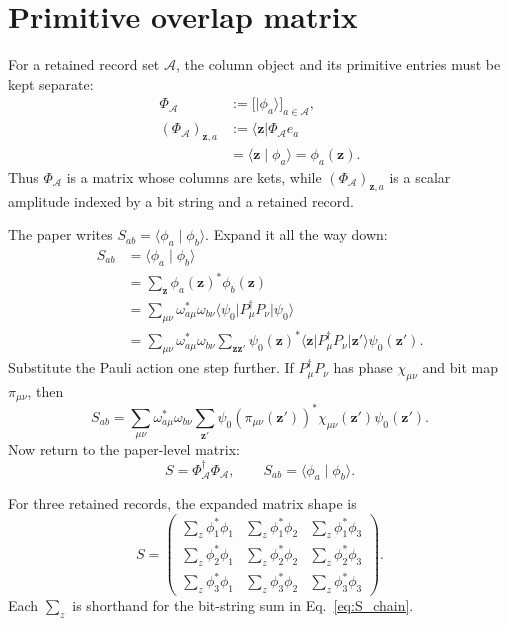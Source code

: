 \documentclass[10pt,twocolumn]{article}
\newcommand{\Acal}{\mathcal A}
\newcommand{\ket}[1]{\lvert #1\rangle}
\newcommand{\bra}[1]{\langle #1\rvert}
\newcommand{\braket}[2]{\langle #1\mid #2\rangle}
\begin{document}
\section{Primitive overlap matrix}

For a retained record set \(\Acal\), the column object and its primitive entries must be kept separate:
\begin{equation}
\begin{aligned}
\Phi_\Acal
&:=\big[\ket{\phi_a}\big]_{a\in\Acal},\\
(\Phi_\Acal)_{\mathbf z,a}
&:=\bra{\mathbf z}\Phi_\Acal e_a\\
&=\braket{\mathbf z}{\phi_a}
=\phi_a(\mathbf z).
\end{aligned}
\label{eq:Phi_entries}
\end{equation}
Thus \(\Phi_\Acal\) is a matrix whose columns are kets, while \((\Phi_\Acal)_{\mathbf z,a}\) is a scalar amplitude indexed by a bit string and a retained record.

The paper writes \(S_{ab}=\braket{\phi_a}{\phi_b}\). Expand it all the way down:
\begin{equation}
\begin{aligned}
S_{ab}
&=\braket{\phi_a}{\phi_b}\\
&=\sum_{\mathbf z}\phi_a(\mathbf z)^*\phi_b(\mathbf z)\\
&=\sum_{\mu\nu}\omega_{a\mu}^*\omega_{b\nu}
\bra{\psi_0}P_\mu^\dagger P_\nu\ket{\psi_0}\\
&=\sum_{\mu\nu}\omega_{a\mu}^*\omega_{b\nu}
\sum_{\mathbf z\mathbf z'}
\psi_0(\mathbf z)^*
\bra{\mathbf z}P_\mu^\dagger P_\nu\ket{\mathbf z'}
\psi_0(\mathbf z').
\end{aligned}
\label{eq:S_chain}
\end{equation}
Substitute the Pauli action one step further. If \(P_\mu^\dagger P_\nu\) has phase \(\chi_{\mu\nu}\) and bit map \(\pi_{\mu\nu}\), then
\begin{equation}
S_{ab}=
\sum_{\mu\nu}\omega_{a\mu}^*\omega_{b\nu}
\sum_{\mathbf z'}
\psi_0(\pi_{\mu\nu}(\mathbf z'))^*
\chi_{\mu\nu}(\mathbf z')
\psi_0(\mathbf z').
\label{eq:S_bit_final}
\end{equation}
Now return to the paper-level matrix:
\begin{equation}
S=\Phi_\Acal^\dagger\Phi_\Acal,
\qquad
S_{ab}=\braket{\phi_a}{\phi_b}.
\label{eq:S_high_return}
\end{equation}

For three retained records, the expanded matrix shape is
\begin{equation}
S=
\begin{pmatrix}
\sum_z\phi_1^*\phi_1&\sum_z\phi_1^*\phi_2&\sum_z\phi_1^*\phi_3\\
\sum_z\phi_2^*\phi_1&\sum_z\phi_2^*\phi_2&\sum_z\phi_2^*\phi_3\\
\sum_z\phi_3^*\phi_1&\sum_z\phi_3^*\phi_2&\sum_z\phi_3^*\phi_3
\end{pmatrix}.
\label{eq:S_matrix_shape}
\end{equation}
Each \(\sum_z\) is shorthand for the bit-string sum in Eq.~\eqref{eq:S_chain}.
\end{document}
